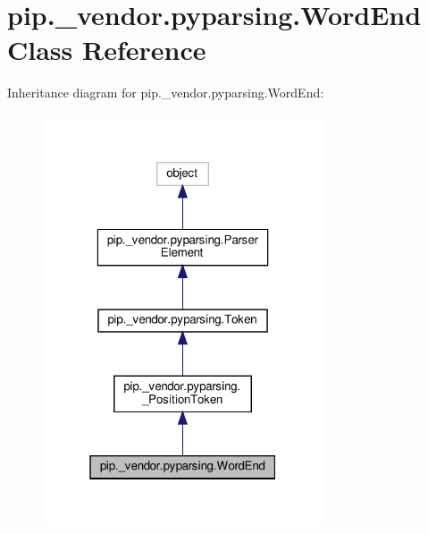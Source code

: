 \hypertarget{classpip_1_1__vendor_1_1pyparsing_1_1WordEnd}{}\section{pip.\+\_\+vendor.\+pyparsing.\+Word\+End Class Reference}
\label{classpip_1_1__vendor_1_1pyparsing_1_1WordEnd}


Inheritance diagram for pip.\+\_\+vendor.\+pyparsing.\+Word\+End\+:
\nopagebreak
\begin{figure}[H]
\begin{center}
\leavevmode
\includegraphics[width=235pt]{classpip_1_1__vendor_1_1pyparsing_1_1WordEnd__inherit__graph}
\end{center}
\end{figure}


